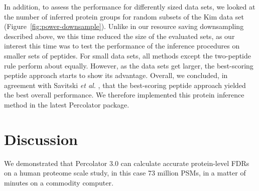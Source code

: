\documentclass{article}
\begin{document}
In addition, to assess the performance for differently sized data
sets, we looked at the number of inferred protein groups for random
subsets of the Kim data set
(Figure~\ref{fig:power-downsample}). Unlike in our resource saving
downsampling described above, we this time reduced the size of the
evaluated sets, as our interest this time was to test the performance
of the inference procedures on smaller sets of peptides. For small
data sets, all methods except the two-peptide rule perform about
equally. However, as the data sets get larger, the best-scoring
peptide approach starts to show its advantage. Overall, we concluded,
in agreement with Savitski {\em et al.} \cite{savitski2015scalable},
that the best-scoring peptide approach yielded the best overall
performance. We therefore implemented this protein inference method in
the latest Percolator package.


\section*{Discussion}

We demonstrated that Percolator 3.0 can calculate accurate
protein-level FDRs on a human proteome scale study, in this case $73$
million PSMs, in a matter of minutes on a commodity computer.
\end{document}
